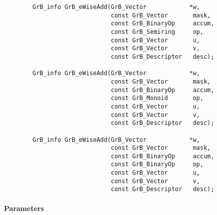 \begin{verbatim}
        GrB_info GrB_eWiseAdd(GrB_Vector            *w,
                              const GrB_Vector       mask,
                              const GrB_BinaryOp     accum,
                              const GrB_Semiring     op, 
                              const GrB_Vector       u,
                              const GrB_Vector       v,
                              const GrB_Descriptor   desc);
                            
        GrB_info GrB_eWiseAdd(GrB_Vector            *w,
                              const GrB_Vector       mask,
                              const GrB_BinaryOp     accum,
                              const GrB_Monoid       op, 
                              const GrB_Vector       u,
                              const GrB_Vector       v,
                              const GrB_Descriptor   desc);
                            
        GrB_info GrB_eWiseAdd(GrB_Vector            *w,
                              const GrB_Vector       mask,
                              const GrB_BinaryOp     accum,
                              const GrB_BinaryOp     op, 
                              const GrB_Vector       u,
                              const GrB_Vector       v,
                              const GrB_Descriptor   desc);
\end{verbatim}

\paragraph{Parameters}

